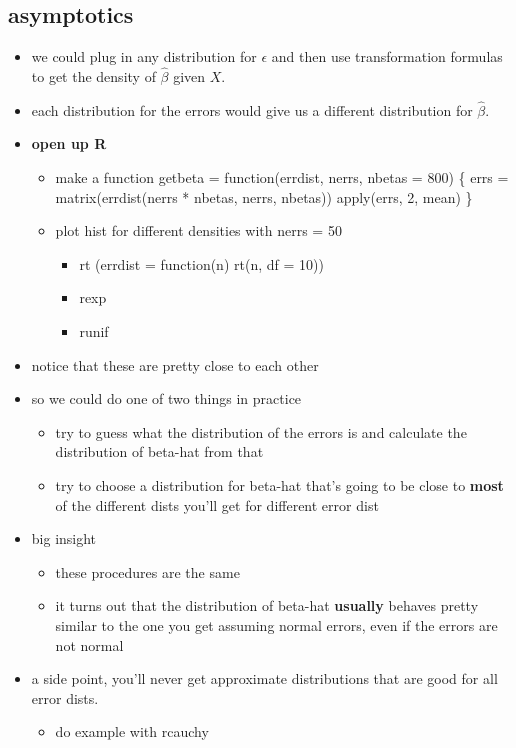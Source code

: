 \subsection{asymptotics}

\begin{itemize}
\item we could plug in any distribution for $\epsilon$ and then use
       transformation formulas to get the density of $\hat\beta$ given $X$.
\item each distribution for the errors would give us a different
       distribution for $\hat\beta$.
\item \textbf{open up R}
\begin{itemize}
\item make a function 
         getbeta = function(errdist, nerrs, nbetas = 800) \{
         errs = matrix(errdist(nerrs * nbetas, nerrs, nbetas))
         apply(errs, 2, mean)
         \}
\item plot hist for different densities with nerrs = 50
\begin{itemize}
\item rt (errdist = function(n) rt(n, df = 10))
\item rexp
\item runif
\end{itemize}
\end{itemize}
\item notice that these are pretty close to each other
\item so we could do one of two things in practice
\begin{itemize}
\item try to guess what the distribution of the errors is and
         calculate the distribution of beta-hat from that
\item try to choose a distribution for beta-hat that's going to be
         close to \textbf{most} of the different dists you'll get for
         different error dist
\end{itemize}
\item big insight
\begin{itemize}
\item these procedures are the same
\item it turns out that the distribution of beta-hat \textbf{usually}
         behaves pretty similar to the one you get assuming normal
         errors, even if the errors are not normal
\end{itemize}
\item a side point, you'll never get approximate distributions
       that are good for all error dists.
\begin{itemize}
\item do example with rcauchy
\end{itemize}
\end{itemize}

